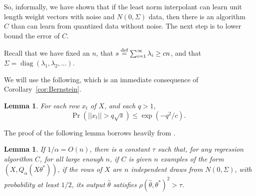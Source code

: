 \documentclass[11pt,notitlepage]{article}
\newcommand{\htheta}{\hat{\theta}}
\newcommand*{\eqdef}{\stackrel{\textup{def}}{=}}
\newcommand\diag {\ensuremath{\operatorname{\mathrm{diag}}}}
\newtheorem{lemma}[theorem]{Lemma}
\begin{document}
So, informally, we have shown that if the least norm interpolant
can learn unit length weight vectors with noise and $N(0,\Sigma)$
data, then there is an algorithm $C$ than can learn
from quantized data without noise.  The next step is to lower
bound the error of $C$.

Recall that we have fixed an $n$, that
$s \eqdef \sum_{i=1}^{\infty} \lambda_i \geq c n$, and that
$\Sigma = \diag(\lambda_1, \lambda_2,...)$.  

We will use the following, which is
an immediate consequence
of Corollary~\ref{cor:Bernstein}.
\begin{lemma}
\label{l:x.short}
For each row $x_t$ of $X$, and each $q > 1$,
\[
\Pr(|| x_t || > q \sqrt{s}) \leq \exp(-q^2/c).
\]
\end{lemma}

The proof of the following lemma borrows heavily
from \cite{benedek1991learnability}.
\begin{lemma}
\label{l:bi}
If $1/\alpha = O(n)$, there is a constant $\tau$ such that,
for any regression algorithm $C$, 
for all large enough $n$, if $C$ is given
$n$ examples of the form $(X, Q_{\alpha} (X \theta^*))$,
if the rows of $X$ are $n$ independent draws from $N(0,\Sigma)$, 
with probability at least $1/2$, its output 
$\htheta$ satisfies $\rho(\htheta, \theta^*)^2 > \tau$.
\end{lemma}
\end{document}
